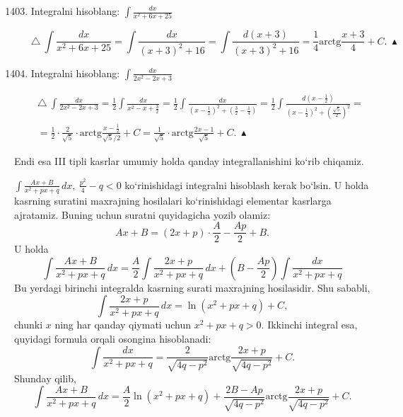 \begin{enumerate}\setcounter{enumi}{1402}
	\item Integralni hisoblang: $\int\frac{dx}{x^2+6x+25}$
	
	$$\triangle\ \int\frac{dx}{x^2+6x+25}=\int\frac{dx}{(x+3)^2+16}=\int\frac{d(x+3)}{(x+3)^2+16}=\frac{1}{4}\mbox{arctg}\frac{x+3}{4}+C.\ \blacktriangle
	$$
	
	\item Integralni hisoblang: $\int\frac{dx}{2x^2-2x+3}$
	
	\begin{multline*}\triangle\ \int\frac{dx}{2x^2-2x+3}=\frac{1}{2}\int\frac{dx}{x^2-x+\frac{3}{2}}=\frac{1}{2}\int\frac{dx}{\left(x-\frac{1}{2}\right)^2+\left(\frac{3}{2}-\frac{1}{4}\right)} = \frac{1}{2}\int\frac{d\left(x-\frac{1}{2}\right)}{\left(x-\frac{1}{2}\right)^2+\left(\frac{\sqrt{5}}{2}\right)^2} =\\
		= \frac{1}{2}\cdot\frac{2}{\sqrt{5}}\cdot\mbox{arctg}\frac{x-\frac{1}{2}}{\sqrt{5}/2}+C=\frac{1}{\sqrt{5}}\cdot\mbox{arctg}\frac{2x-1}{\sqrt{5}}+C.\ \blacktriangle
\end{multline*}
\end{enumerate}
Endi esa III tipli kasrlar umumiy holda qanday integrallanishini ko`rib chiqamiz.

$\int\frac{Ax+B}{x^2+px+q}\,dx,\ \frac{p^2}{4}-q<0$ ko`rinishidagi integralni hisoblash kerak bo`lsin. U holda kasrning suratini maxrajning hosilalari ko`rinishidagi elementar kasrlarga ajratamiz. Buning uchun suratni quyidagicha yozib olamiz:
$$Ax+B=(2x+p)\cdot\frac{A}{2}-\frac{Ap}{2}+B.$$U holda
$$\int\frac{Ax+B}{x^2+px+q}\,dx=\frac{A}{2}\int\frac{2x+p}{x^2+px+q}\,dx+\left(B-\frac{Ap}{2}\right)\int\frac{dx}{x^2+px+q}$$
Bu yerdagi birinchi integralda kasrning surati maxrajning hosilasidir. Shu sababli, 
$$\int\frac{2x+p}{x^2+px+q}\,dx=\ln(x^2+px+q)+C,$$
chunki $x$ ning har qanday qiymati uchun $x^2+px+q>0$. Ikkinchi integral esa, quyidagi formula orqali osongina hisoblanadi:
$$\int\frac{dx}{x^2+px+q}=\frac{2}{\sqrt{4q-p^2}}\mbox{arctg}\frac{2x+p}{\sqrt{4q-p^2}}+C.$$
Shunday qilib, 
$$\int\frac{Ax+B}{x^2+px+q}\,dx=\frac{A}{2}\ln(x^2+px+q)+\frac{2B-Ap}{\sqrt{4q-p^2}}\mbox{arctg}\frac{2x+p}{\sqrt{4q-p^2}}+C.$$

